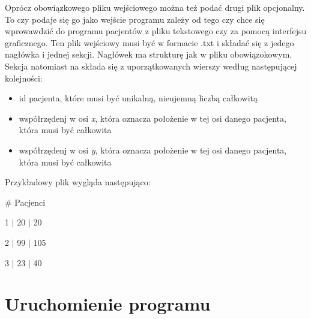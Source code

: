 \documentclass[10pt,a4paper]{article}
\begin{document}
Oprócz obowiązkowego pliku wejściowego można też podać drugi plik opcjonalny. To czy podaje się go jako wejście programu zależy od tego czy chce się wprowawdzić do programu pacjentów z pliku tekstowego czy za pomocą interfejsu graficznego. Ten plik wejściowy musi być w formacie .txt i składać się z jedego nagłówka i jednej sekcji. Nagłówek ma strukturę jak w pliku obowiązokowym. Sekcja natomiast na składa się z uporzątkowanych wierszy według następującej kolejności:
\begin{itemize}
\item id pacjenta, które musi być unikalną, nieujemną liczbą całkowitą
\item współrzędenj w osi \textit{x}, która oznacza położenie w tej osi danego pacjenta, która musi być całkowita
\item współrzędenj w osi \textit{y}, która oznacza położenie w tej osi danego pacjenta, która musi być całkowita
\end{itemize}
Przykładowy plik wygląda następująco:
\begin{description}[style=multiline,leftmargin=3cm]
\item \# Pacjenci
\item 1 $\mid$ 20 $\mid$ 20
\item 2 $\mid$ 99 $\mid$ 105
\item 3 $\mid$ 23 $\mid$ 40
\end{description}

\section{Uruchomienie programu}
\end{document}
